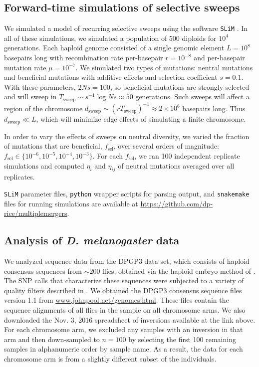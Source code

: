 \documentclass[11pt, letterpaper]{article}   	%
\begin{document}
\subsection*{Forward-time simulations of selective sweeps}

We simulated a model of recurring selective sweeps using the software \texttt{SLiM} \autocite{Messer2013}.
In all of these simulations, we simulated a population of 500 diploids for $10^4$ generations.
Each haploid genome consisted of a single genomic element $L=10^8$ basepairs long with recombination rate per-basepair $r = 10^{-8}$ and per-basepair mutation rate $\mu = 10^{-7}$.
We simulated two types of mutations: neutral mutations and beneficial mutations with additive effects and selection coefficient $s=0.1$.
With these parameters, $2Ns = 100$, so beneficial mutations are strongly selected and will sweep in $T_{\text{sweep}}\sim s^{-1} \log Ns \approx 50$ generations.
Such sweeps will affect a region of the chromosome $d_{\text{sweep}} \sim (r T_{\text{sweep}})^{-1} \approx 2 \times 10^6$ basepairs long.
Thus $d_{\text{sweep}} \ll L$, which will minimize edge effects of simulating a finite chromosome.

In order to vary the effects of sweeps on neutral diversity, we varied the fraction of mutations that are beneficial, $f_{\text{sel}}$, over several orders of magnitude: $f_{\text{sel}} \in \{10^{-6}, 10^{-5}, 10^{-4}, 10^{-3}\}$.
For each $f_{\text{sel}}$, we ran 100 independent replicate simulations and computed $\eta_i$ and $\eta_{ij}$ of neutral mutations averaged over all replicates.

\texttt{SLiM} parameter files, \texttt{python} wrapper scripts for parsing output, and \texttt{snakemake} files for running simulations are available at \url{https://github.com/dp-rice/multiplemergers}.

\subsection*{Analysis of \textit{D. melanogaster} data}

We analyzed sequence data from the DPGP3 data set, which consists of haploid consensus sequences from ${\sim}200$ flies, obtained via the haploid embryo method of \textcite{LangleyEtAl2011}.
The SNP calls that characterize these sequences were subjected to a variety of quality filters described in \textcite{LackEtAl2015}.
We obtained the DPGP3 consensus sequence files version 1.1 from \url{www.johnpool.net/genomes.html}.
These files contain the sequence alignments of all flies in the sample on all chromosome arms.
We also downloaded the Nov. 3, 2016 spreadsheet of inversions available at the link above.
For each chromosome arm, we excluded any samples with an inversion in that arm and then down-sampled to $n=100$ by selecting the first 100 remaining samples in alphanumeric order by sample name.
As a result, the data for each chromosome arm is from a slightly different subset of the individuals.
\end{document}

